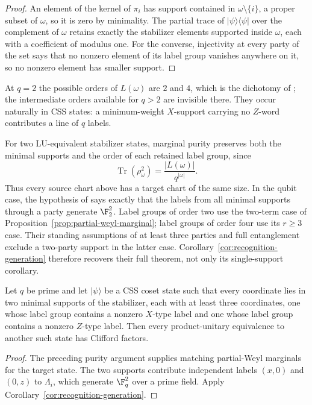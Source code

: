 \begin{proof}
An element of the kernel of \(\pi_i\) has support contained in
\(\omega\setminus\{i\}\), a proper subset of \(\omega\), so it is zero by
minimality.  The partial trace of \(\lvert\psi\rangle\langle\psi\rvert\)
over the complement of \(\omega\) retains exactly the stabilizer elements
supported inside \(\omega\), each with a coefficient of modulus one.  For
the converse, injectivity at every party of the set says that no nonzero
element of its label group vanishes anywhere on it, so no nonzero element
has smaller support.
\end{proof}

At \(q=2\) the possible orders of \(L(\omega)\) are \(2\) and \(4\), which
is the dichotomy of \cite[Lemma~1]{VanDenNestDehaeneDeMoor2005}; the
intermediate orders available for \(q>2\) are invisible there.  They occur
naturally in CSS states: a minimum-weight \(X\)-support carrying no
\(Z\)-word contributes a line of \(q\) labels.

For two LU-equivalent stabilizer states, marginal purity preserves both the
minimal supports and the order of each retained label group, since
\[
 \operatorname{Tr}(\rho_\omega^2)
   =\frac{|L(\omega)|}{q^{|\omega|}}.
\]
Thus every source chart above has a target chart of the same size.  In the
qubit case, the hypothesis of
\cite[Theorem~1]{VanDenNestDehaeneDeMoor2005} says exactly that the labels
from all minimal supports through a party generate \(\F_2^2\).  Label
groups of order two use the two-term case of
Proposition~\ref{prop:partial-weyl-marginal}; label groups of order four
use its \(r\geq3\) case.  Their standing assumptions of at least three
parties and full entanglement exclude a two-party support in the latter case.
Corollary~\ref{cor:recognition-generation} therefore recovers their full
theorem, not only its single-support corollary.

\begin{corollary}\label{cor:css-recognition}
Let \(q\) be prime and let \(\lvert\psi\rangle\) be a CSS coset state such
that every coordinate lies in two minimal supports of the stabilizer, each
with at least three coordinates, one whose label group contains a nonzero
\(X\)-type label and one whose label group contains a nonzero \(Z\)-type
label.  Then every product-unitary equivalence to another such state has
Clifford factors.
\end{corollary}

\begin{proof}
The preceding purity argument supplies matching partial-Weyl marginals for
the target state.
The two supports contribute independent labels \((x,0)\) and \((0,z)\) to
\(\Lambda_i\), which generate \(\F_q^2\) over a prime field.  Apply
Corollary~\ref{cor:recognition-generation}.
\end{proof}

